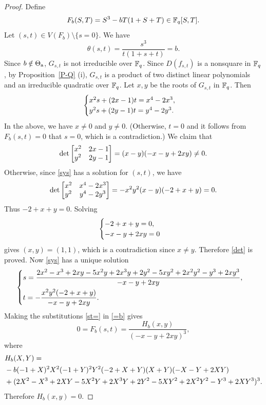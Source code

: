 \documentclass{amsart}
\numberwithin{equation}{section}
\theoremstyle{definition}
\newcommand{\f}{\Bbb F}
\begin{document}
\begin{proof}
Define
\begin{equation}\label{Fb}
F_b(S,T)=S^3-bT(1+S+T)\in\f_q[S,T].
\end{equation}
Let $(s,t)\in V(F_b)\setminus\{s=0\}$. We have
\begin{equation}\label{=b}
\theta(s,t)=\frac{s^3}{t(1+s+t)}=b.
\end{equation}
Since $b\notin\Theta_{\rm a}$, $G_{s,t}$ is not irreducible over $\f_q$. Since $D(f_{s,t})$ is a nonsquare in $\f_q$, by Proposition~\ref{P-Q} (i), $G_{s,t}$ is a product of two distinct linear polynomials and an irreducible quadratic over $\f_q$. Let $x,y$ be the roots of $G_{s,t}$ in $\f_q$. Then 
\begin{equation}\label{sys}
\begin{cases}
x^2s+(2x-1)t=x^4-2x^3,\cr
y^2s+(2y-1)t=y^4-2y^3.
\end{cases}
\end{equation}
In the above, we have $x\ne 0$ and $y\ne0$. (Otherwise, $t=0$ and it follows from $F_b(s,t)=0$ that $s=0$, which is a contradiction.) We claim that
\begin{equation}\label{det}
\det\left[\begin{matrix} x^2&2x-1\cr y^2& 2y-1\end{matrix}\right]=(x - y) (-x - y + 2 x y)\ne 0.
\end{equation}
Otherwise, since \eqref{sys} has a solution for $(s,t)$, we have
\[
\det\left[\begin{matrix} x^2&x^4-2x^3\cr y^2& y^4-2y^3\end{matrix}\right]=-x^2 y^2 (x - y) (-2 + x + y)= 0.
\]
Thus $-2 + x + y=0$. Solving
\[
\begin{cases}
-2 + x + y=0,\cr
-x - y + 2 x y=0
\end{cases}
\]
gives $(x,y)=(1,1)$, which is a contradiction since $x\ne y$. Therefore \eqref{det} is proved. Now \eqref{sys} has a unique solution
\begin{equation}\label{st=}
\begin{cases}
s=\displaystyle\frac{2 x^2 - x^3 + 2 x y - 5 x^2 y + 2 x^3 y + 2 y^2 - 5 x y^2 + 
 2 x^2 y^2 - y^3 + 2 x y^3}{-x-y+2 x y},\vspace{0.4em}\cr
t=-\displaystyle\frac{x^2 y^2 (-2 + x + y)}{-x-y+2 x y}.
\end{cases}
\end{equation}
Making the substitutions \eqref{st=} in \eqref{=b} gives 
\[
0=F_b(s,t)=\frac{H_b(x,y)}{(-x-y+2xy)^3},
\]
where
\begin{align}\label{Hb}
&H_b(X,Y)=\\
&-b (-1+X)^2 X^2 (-1+Y)^2 Y^2 (-2+X+Y) (X+Y) (-X-Y+2 X Y)\cr
&+(2 X^2-X^3+2 X Y-5 X^2 Y+2 X^3 Y+2 Y^2-5 X Y^2+2 X^2 Y^2-Y^3+2 X Y^3)^3.\nonumber
\end{align}
Therefore $H_b(x,y)=0$. 


\end{proof}
\end{document}
